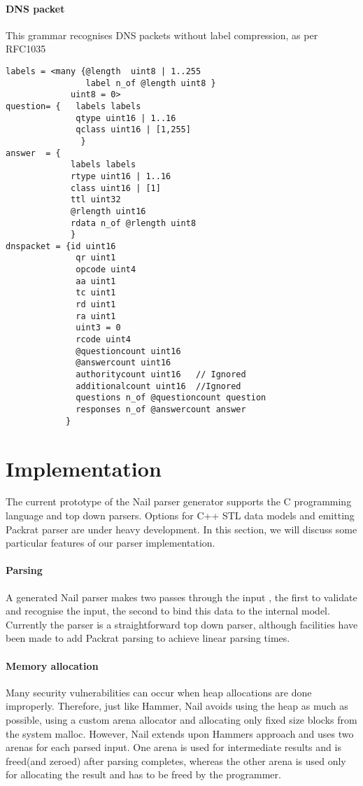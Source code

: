 \documentclass[10pt]{article}
\begin{document}
\paragraph{DNS packet}
This grammar recognises DNS packets without label compression, as per RFC1035 
\begin{verbatim}
labels = <many {@length  uint8 | 1..255 
                label n_of @length uint8 }
             uint8 = 0>
question= {   labels labels
              qtype uint16 | 1..16 
              qclass uint16 | [1,255]
               }
answer  = {
             labels labels
             rtype uint16 | 1..16
             class uint16 | [1]
             ttl uint32
             @rlength uint16 
             rdata n_of @rlength uint8 
             }
dnspacket = {id uint16
              qr uint1
              opcode uint4
              aa uint1 
              tc uint1
              rd uint1
              ra uint1
              uint3 = 0
              rcode uint4
              @questioncount uint16
              @answercount uint16
              authoritycount uint16   // Ignored
              additionalcount uint16  //Ignored       
              questions n_of @questioncount question         
              responses n_of @answercount answer
            }
\end{verbatim}


\section{Implementation}
The current prototype of the Nail parser generator supports the C programming language and top down parsers. Options for C++ STL data models and emitting Packrat parser
\cite{packrat-parsing:icfp02} are under heavy development. In this section, we will discuss some particular
features of our parser implementation.

\paragraph{Parsing}
A generated Nail parser makes two passes through the input , the first to validate and recognise the
input, the second to bind this data to the internal model. Currently the parser is a straightforward
top down parser, although facilities have been made to add Packrat parsing to achieve linear parsing times.
\paragraph{Memory allocation} 
Many security vulnerabilities can occur when heap allocations are done improperly. Therefore, just
like Hammer, Nail avoids using the heap as much as possible, using a custom arena allocator and
allocating only fixed size blocks from the system malloc. However, Nail extends upon Hammers
approach and uses two arenas for each parsed input. One arena is used for intermediate results and is
freed(and zeroed) after parsing completes, whereas the other arena is used only for allocating the
result and has to be freed by the programmer. 
\end{document}
